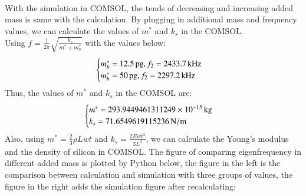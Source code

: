 \documentclass[a4paper,12pt,reqno]{report}
\begin{document}
    \paragraph{}
    With the simulation in COMSOL, the tends of decreasing and increasing added mass is same with the calculation.
    By plugging in additional mass and frequency values, we can calculate the values of $m^*$ and $k_s$ in the COMSOL.\\
    Using $f=\frac{1}{2\pi}\sqrt{\frac{k_s}{m^*+m_b^*}}$ with the values below:
    \begin{equation}
        \begin{cases}
            m_b^*=12.5\,\unit{\pg}, f_2=2433.7\,\unit{\kHz}\\
            m_b^*=50\,\unit{\pg}, f_2=2297.2\,\unit{\kHz}
        \end{cases}
        \notag
    \end{equation}
    Thus, the values of $m^*$ and $k_s$ in the COMSOL are:
    \begin{equation}
        \begin{cases}
            m^*=293.9449461311249\times10^{-15}\,\unit{\kg}\\
            k_s=71.6549619115236\,\unit{\N/\m}
        \end{cases}
        \notag
    \end{equation}
    Also, using $m^*=\frac{2}{3} \rho Lwt$ and $k_s=\frac{2Ewt^3}{3L^3}$, we can calculate the Young's modulus and the density of silicon in COMSOL.
    The figure of comparing eigenfrequency in different added mass is plotted by Python below, 
    the figure in the left is the comparison between calculation and simulation with three groups of values, the figure in the right adds the simulation figure after recalculating:
\end{document}
